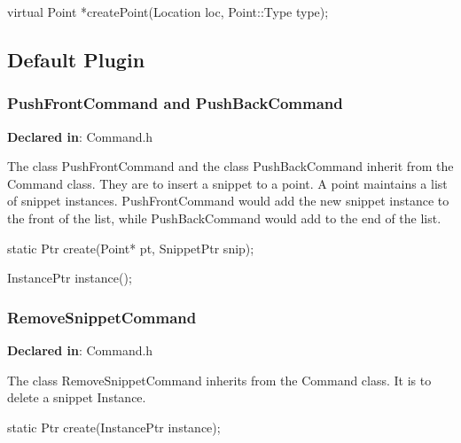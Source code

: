 \begin{apient}
virtual Point *createPoint(Location loc, Point::Type type);
\end{apient}


\subsection{Default Plugin}
\label{sec-3.3}

\subsubsection{PushFrontCommand and PushBackCommand}
\label{sec-3.3.1}

\textbf{Declared in}: Command.h

The class PushFrontCommand and the class PushBackCommand inherit from the
Command class. They are to insert a snippet to a point. A point maintains a
list of snippet instances. PushFrontCommand would add the new snippet instance
to the front of the list, while PushBackCommand would add to the end of the
list.


\begin{apient}
static Ptr create(Point* pt, SnippetPtr snip);
\end{apient}


\begin{apient}
InstancePtr instance();
\end{apient}


\subsubsection{RemoveSnippetCommand}
\label{sec-3.3.2}

\textbf{Declared in}: Command.h

The class RemoveSnippetCommand inherits from the Command class. It is to delete
a snippet Instance.


\begin{apient}
static Ptr create(InstancePtr instance);
\end{apient}

